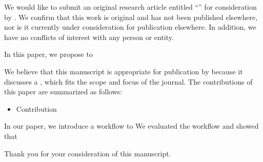 We would like to submit an original research article entitled ``\paperTitle{}'' for consideration by \journalName{}. We confirm that this work is original and has not been published elsewhere, nor is it currently under consideration for publication elsewhere. In addition, we have no conflicts of interest with any person or entity.

In this paper, we propose to \lipsum[1][2]

We believe that this manuscript is appropriate for publication by \journalName{} because it discusses a \lipsum[1][1], which fits the scope and focus of the journal. The contributions of this paper are summarized as follows:

\begin{itemize}
    \item Contribution
\end{itemize}

In our paper, we introduce a workflow to \lipsum[1][1] We evaluated the workflow and showed that \lipsum[1][1]

Thank you for your consideration of this manuscript.